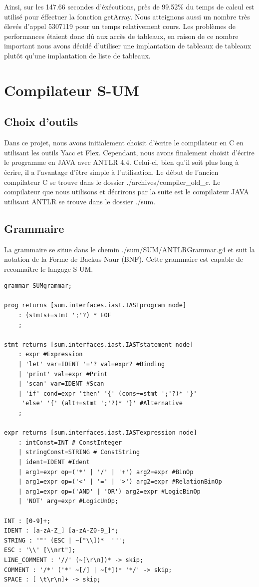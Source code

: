 \documentclass[a4paper,12pt]{report}
\begin{document}
Ainsi, sur les 147.66 secondes d'éxécutions, près de 99.52\% du temps de calcul est utilisé pour éffectuer la fonction getArray.
Nous atteignons aussi un nombre très élevés d'appel 5307119 pour un temps relativement cours. Les problèmes de performances 
étaient donc dû aux accès de tableaux, en raison de ce nombre important nous avons décidé d'utiliser une implantation de tableaux de
tableaux plutôt qu'une implantation de liste de tableaux.


\chapter{Compilateur S-UM}
\section{Choix d'outils}
Dans ce projet, nous avons initialement choisit d'écrire le compilateur en C en utilisant les outils Yacc et Flex. Cependant,
nous avons finalement choisit d'écrire le programme en JAVA avec ANTLR 4.4. Celui-ci, bien qu'il soit plus long à écrire, il a
l'avantage d'être simple à l'utilisation.
Le début de l'ancien compilateur C se trouve dans le dossier ./archives/compiler\_old\_c.
Le compilateur que nous utilisons et décrirons par la suite est le compilateur JAVA utilisant ANTLR se trouve dans le dossier 
./sum.

\section{Grammaire}
La grammaire se situe dans le chemin ./sum/SUM/ANTLRGrammar.g4 et suit la notation de la Forme de Backus-Naur (BNF).
Cette grammaire est capable de reconnaître le langage S-UM.
\begin{verbatim}
grammar SUMgrammar;

prog returns [sum.interfaces.iast.IASTprogram node]
	: (stmts+=stmt ';'?) * EOF
	;
	
stmt returns [sum.interfaces.iast.IASTstatement node]
	: expr #Expression
	| 'let' var=IDENT '='? val=expr? #Binding
	| 'print' val=expr #Print
	| 'scan' var=IDENT #Scan
	| 'if' cond=expr 'then' '{' (cons+=stmt ';'?)* '}'
	 'else' '{' (alt+=stmt ';'?)* '}' #Alternative
	;
	
expr returns [sum.interfaces.iast.IASTexpression node]
	: intConst=INT # ConstInteger
	| stringConst=STRING # ConstString
	| ident=IDENT #Ident
	| arg1=expr op=('*' | '/' | '+') arg2=expr #BinOp
	| arg1=expr op=('<' | '=' | '>') arg2=expr #RelationBinOp
	| arg1=expr op=('AND' | 'OR') arg2=expr #LogicBinOp
	| 'NOT' arg=expr #LogicUnOp;
	
INT : [0-9]+;
IDENT : [a-zA-Z_] [a-zA-Z0-9_]*;
STRING : '"' (ESC | ~["\\])*  '"';
ESC : '\\' [\\nrt"];
LINE_COMMENT : '//' (~[\r\n])* -> skip;
COMMENT : '/*' ('*' ~[/] | ~[*])* '*/' -> skip;
SPACE : [ \t\r\n]+ -> skip;
\end{verbatim}
\end{document}
